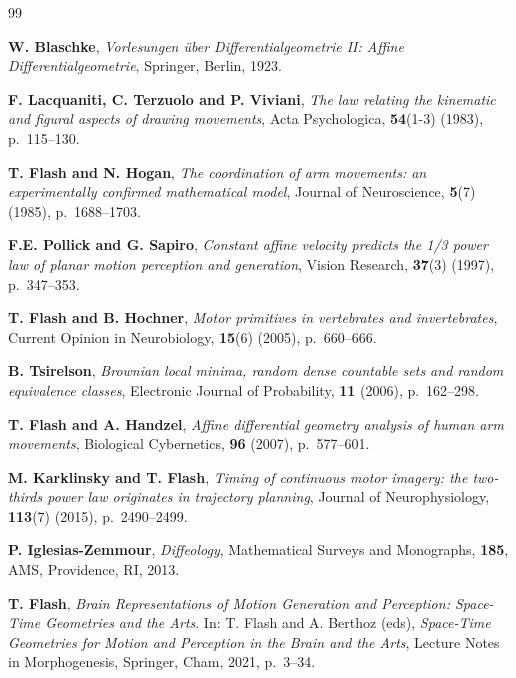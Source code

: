 \documentclass[10pt,letterpaper,reqno]{amsart}
\begin{document}
  \begin{thebibliography}{99}
    
    \textbf{W. Blaschke},
    \textit{Vorlesungen über Differentialgeometrie II: Affine Differentialgeometrie},
    Springer, Berlin, 1923.
    
    \textbf{F. Lacquaniti, C. Terzuolo and P. Viviani},
    \textit{The law relating the kinematic and figural aspects of drawing movements},
    Acta Psychologica,
    \textbf{54}(1-3) (1983), p.~115--130.
    
    \textbf{T. Flash and N. Hogan},
    \textit{The coordination of arm movements: an experimentally confirmed mathematical model},
    Journal of Neuroscience,
    \textbf{5}(7) (1985), p.~1688--1703.
    
    \textbf{F.E. Pollick and G. Sapiro},
    \textit{Constant affine velocity predicts the 1/3 power law of planar motion perception and generation},
    Vision Research,
    \textbf{37}(3) (1997), p.~347--353.
    
    \textbf{T. Flash and B. Hochner},
    \textit{Motor primitives in vertebrates and invertebrates},
    Current Opinion in Neurobiology,
    \textbf{15}(6) (2005), p.~660--666.
    
    \textbf{B. Tsirelson},
    \textit{Brownian local minima, random dense countable sets and random equivalence classes},
    Electronic Journal of Probability,
    \textbf{11} (2006), p.~162--298.
    
    \textbf{T. Flash and A. Handzel},
    \textit{Affine differential geometry analysis of human arm movements},
    Biological Cybernetics,
    \textbf{96} (2007), p.~577--601.
    
    \textbf{M. Karklinsky and T. Flash},
    \textit{Timing of continuous motor imagery: the two-thirds power law originates in trajectory planning},
    Journal of Neurophysiology,
    \textbf{113}(7) (2015), p.~2490--2499.
    
    \textbf{P. Iglesias-Zemmour},
    \textit{Diffeology},
    Mathematical Surveys and Monographs,
    \textbf{185},
    AMS, Providence, RI, 2013.
    
    \textbf{T. Flash},
    \textit{Brain Representations of Motion Generation and Perception: Space-Time Geometries and the Arts}.
    In: T. Flash and A. Berthoz (eds), \textit{Space-Time Geometries for Motion and Perception in the Brain and the Arts},
    Lecture Notes in Morphogenesis, Springer, Cham, 2021, p.~3--34.
    

\end{thebibliography}
\end{document}

